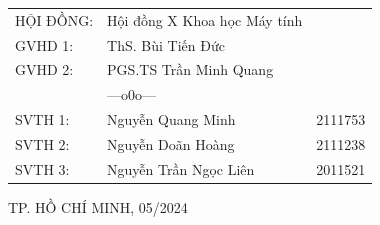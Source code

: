 \begin{titlepage}
    \vspace{1.5cm}
    \begin{table}[h!]
        \raggedleft
        \bfseries
        \renewcommand{\arraystretch}{1.2}
        \fontsize{15pt}{15pt}\selectfont
        \begin{tabular}{llc}
            HỘI ĐỒNG:   & Hội đồng X Khoa học Máy tính &\\
            GVHD 1:     & ThS. Bùi Tiến Đức \\
            GVHD 2:     & PGS.TS Trần Minh Quang \\
            
            & \quad\quad---o0o--- &  \\
            SVTH 1:     & Nguyễn Quang Minh      & 2111753 \\
            SVTH 2:     & Nguyễn Doãn Hoàng      & 2111238 \\
            SVTH 3:     & Nguyễn Trần Ngọc Liên  & 2011521 \\
        \end{tabular}
    \end{table}
    
    \begin{center}
        \vspace{1cm}\fontsize{14pt}{9pt}\selectfont
        
        TP. HỒ CHÍ MINH, 05/2024
    \end{center}
\end{titlepage}
